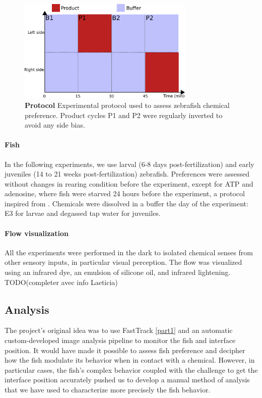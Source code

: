     \begin{figure}[h]
      \centering
      \includegraphics[width=0.75\textwidth]{part_2/assets/protocol.png}
      \caption{\textbf{Protocol} Experimental protocol used to assess zebrafish chemical preference. Product cycles P1 and P2 were regularly inverted to avoid any side bias.}
      \label{exp_protocol}
    \end{figure}

  \paragraph{Fish} In the following experiments, we use larval (6-8 days post-fertilization) and early juveniles (14 to 21 weeks post-fertilization) zebrafish. Preferences were assessed without changes in rearing condition before the experiment, except for ATP and adenosine, where fish were starved 24 hours before the experiment, a protocol inspired from \cite{wakisaka2017adenosine}. Chemicals were dissolved in a buffer the day of the experiment: E3 \cite{} for larvae and degassed tap water for juveniles.

  \paragraph{Flow visualization} All the experiments were performed in the dark to isolated chemical senses from other sensory inputs, in particular visual perception. The flow was visualized using an infrared dye, an emulsion of silicone oil, and infrared lightening. TODO(completer avec info Laeticia)

  \subsection{Analysis}
  The project's original idea was to use FastTrack \ref{part1} and an automatic custom-developed image analysis pipeline to monitor the fish and interface position. It would have made it possible to assess fish preference and decipher how the fish modulate its behavior when in contact with a chemical. However, in particular cases, the fish's complex behavior coupled with the challenge to get the interface position accurately pushed us to develop a manual method of analysis that we have used to characterize more precisely the fish behavior.

